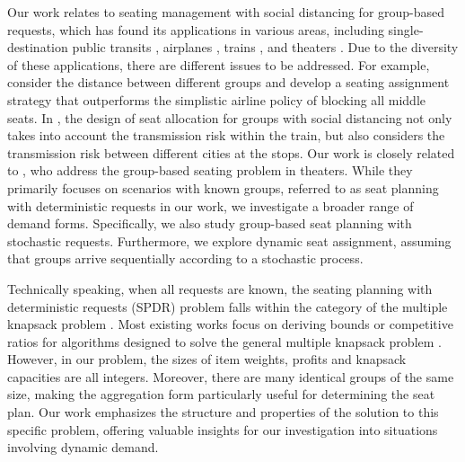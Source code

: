 Our work relates to seating management with social distancing for group-based requests, which has found its applications in various areas, including single-destination public transits \citep{moore2021seat}, airplanes \citep{ghorbani2020model, salari2022social}, trains \citep{haque2022optimization, haque2023social}, and theaters \citep{blom2022filling}. Due to the diversity of these applications, there are different issues to be addressed. For example, \citet{salari2022social} consider the distance between different groups and develop a seating assignment strategy that outperforms the simplistic airline policy of blocking all middle seats. In \citet{haque2023social}, the design of seat allocation for groups with social distancing not only takes into account the transmission risk within the train, but also considers the transmission risk between different cities at the stops. Our work is closely related to \citet{blom2022filling}, who address the group-based seating problem in theaters. While they primarily focuses on scenarios with known groups, referred to as seat planning with deterministic requests in our work, we investigate a broader range of demand forms. Specifically, we also study group-based seat planning with stochastic requests. Furthermore, we explore dynamic seat assignment, assuming that groups arrive sequentially according to a stochastic process.


Technically speaking, when all requests are known, the seating planning with deterministic requests (SPDR) problem falls within the category of the multiple knapsack problem \citep{martello1990knapsack}. Most existing works focus on deriving bounds or competitive ratios for algorithms designed to solve the general multiple knapsack problem \citep{khuri1994zero, ferreira1996solving, pisinger1999exact, chekuri2005polynomial}. However, in our problem, the sizes of item weights, profits and knapsack capacities are all integers. Moreover, there are many identical groups of the same size, making the aggregation form particularly useful for determining the seat plan. Our work emphasizes the structure and properties of the solution to this specific problem, offering valuable insights for our investigation into situations involving dynamic demand.



